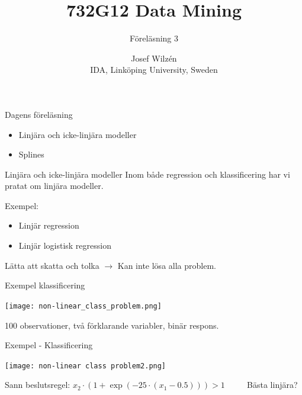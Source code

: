 \documentclass[10pt,english]{beamer}
\title{732G12 Data Mining}
\subtitle{Föreläsning 3}
\date{}
\author{Josef Wilzén \\ IDA, Linköping University, Sweden}
\begin{document}
\maketitle

\begin{frame}{Dagens föreläsning}

    \begin{itemize}
        \item Linjära och icke-linjära modeller
        \item Splines
    \end{itemize}
    
\end{frame}

\begin{frame}{Linjära och icke-linjära modeller}
    Inom både regression och klassificering har vi pratat om linjära modeller.

    Exempel:
    \begin{itemize}
        \item Linjär regression
        \item Linjär logistisk regression
    \end{itemize}

    Lätta att skatta och tolka $\rightarrow$ Kan inte lösa alla problem.
\end{frame}

\begin{frame}{Exempel klassificering}
   
   \texttt{[image: non-linear\_class\_problem.png]}
   
    100 observationer, två förklarande variabler, binär respons.

   
\end{frame}


\begin{frame}{Exempel - Klassificering}
    
    \texttt{[image: non-linear class problem2.png]}

    Sann beslutsregel: $x_2 \cdot (1 + \exp(-25 \cdot (x_1 - 0.5))) > 1$ $\qquad$ Bästa linjära?

\end{frame}
\end{document}
